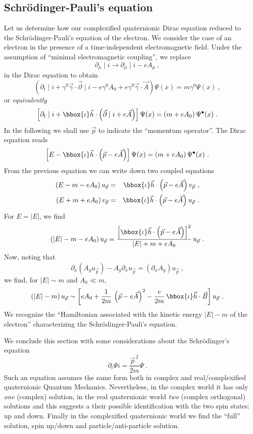 \subsection{Schr\"odinger-Pauli's equation}
\label{s41}

Let us determine how our complexified quaternionic Dirac equation reduced 
to the Schr\"odinger-Pauli's equation of the electron. We consider the case 
of an electron in the presence of a time-independent electromagnetic field.
Under the assumption of ``minimal electromagnetic coupling'', we replace
\[ 
\partial_{\mu} \mid i \rightarrow \partial_{\mu} \mid i - e A_{\mu}~,
\]
in the Dirac equation to obtain
\[ 
\left( \partial_t \mid i + \gamma^0 \vec{\gamma} \cdot \vec{\partial} \mid i 
- e \gamma^{0} A_{0} + e \gamma^0 \vec{\gamma} \cdot \vec{A}
\right)
\Psi (x) 
= m \gamma^0 \Psi(x)~,
\]
or {\em equivalently}
\[ 
\left[ \partial_t \mid i + \bbox{\iota} \vec{h} \cdot 
\left( \vec{\partial} \mid i + e \vec{A} \right) 
\right]
\Psi (x) 
= \left( m +e A_0 \right) \Psi^{\bullet}(x)~.
\]
In the following we shall use $\vec{p}$ to indicate the ``momentum operator''.
The Dirac equation reads
\[ 
\left[ E - \bbox{\iota} \vec{h} \cdot 
\left( \vec{p} - e \vec{A} \right) 
\right]
\Psi (x) 
= \left( m +e A_0 \right) \Psi^{\bullet}(x)~.
\]
From the previous equation we can write down two coupled equations
\begin{eqnarray*} 
\left( E - m - e A_0 \right) u_{\vec{p}} & = &   
\bbox{\iota} \vec{h} \cdot 
\left( \vec{p} - e \vec{A} \right) 
v_{\vec{p}}~,\\
\left( E + m + e A_0 \right) v_{\vec{p}} & = &   
\bbox{\iota} \vec{h} \cdot 
\left( \vec{p} - e \vec{A} \right) 
u_{\vec{p}}~.
\end{eqnarray*}
For $E=|E|$, we find
\[ 
\left( |E| - m - e A_0 \right) u_{\vec{p}}  =    
\frac{\left[ \bbox{\iota} \vec{h} \cdot 
\left( \vec{p} - e \vec{A} \right) \right] ^2}{|E| + m + e A_0} \, 
u_{\vec{p}}~.
\]
Now, noting that
\[ \partial_x \left( A_y u_{\vec{p}} \right) - 
   A_y \partial_x u_{\vec{p}} =
   \left( \partial_x A_y \right) u_{\vec{p}}~, \]
we find, for $|E| \sim m$ and $A_0 \ll m$,
\[
\left( |E| - m \right) u_{\vec{p}} \sim     
\left[ eA_0 + \frac{1}{2m} \, \left( \vec{p} - e \vec{A} \right)^2
- \frac{e}{2m} \, \bbox{\iota} \vec{h} \cdot \vec{B} \right]
u_{\vec{p}}~.
\]
We recognize the ``Hamiltonian associated with the kinetic 
energy $|E|-m$ of the electron'' characterizing the Schr\"odinger-Pauli's  
equation.

We conclude this section with some considerations about 
the Schr\"odinger's equation
\[ \partial_t \Psi i = \frac{\vec{p}^{\, 2}}{2m} \Psi~.\]
Such an equation assumes the same form both in complex and real/complexified 
quaternionic Quantum Mechanics. Nevertheless,  in the complex world it has 
only {\em one} (complex) solution,  
in the real quaternionic world {\em two} (complex orthogonal) solutions 
and this suggests a their possible identification with the two spin states:
up and down. Finally in the complexified quaternionic world we find 
the ``full'' solution, spin up/down and particle/anti-particle solution.


